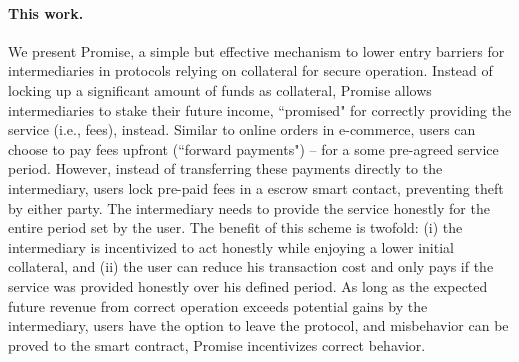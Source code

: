 \documentclass[runningheads]{llncs}
\newcommand{\sys}{Promise\xspace}
\begin{document}
\paragraph{This work.}
We present \sys, a simple but effective mechanism to lower entry barriers for intermediaries in protocols relying on collateral for secure operation.
Instead of locking up a significant amount of funds as collateral, \sys allows intermediaries to stake their future income, ``promised" for correctly providing the service (i.e., fees), instead.
Similar to online orders in e-commerce, users can choose to pay fees upfront (``forward payments") -- for a some pre-agreed service period.
However, instead of transferring these payments directly to the intermediary, users lock pre-paid fees in a escrow smart contact, preventing theft by either party. 
The intermediary needs to provide the service honestly for the entire period set by the user.
The benefit of this scheme is twofold: (i) the intermediary is incentivized to act honestly while enjoying a lower initial collateral, and (ii) the user can reduce his transaction cost and only pays if the service was provided honestly over his defined period. %
As long as the expected future revenue from correct operation exceeds potential gains by the intermediary, users have the option to leave the protocol, and misbehavior can be proved to the smart contract, \sys incentivizes correct behavior.
\end{document}
